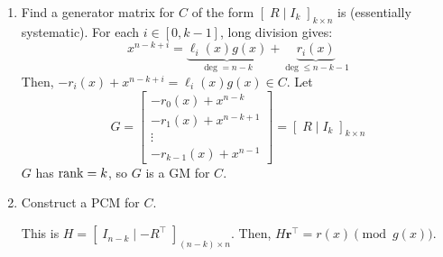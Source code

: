 \begin{enumerate}[label=(\roman*)]
    \item Find a generator matrix for $ C $ of the form
          $\left[ \; R\mid I_k\; \right]_{k\times n}$ is (essentially systematic).
          For each $ i\in [0,k-1] $, long division gives:
          \[ x^{n-k+i}=
              \underbrace{\ell_i(x)g(x)}_{\deg=n-k}+\underbrace{r_i(x)}_{\deg\leqslant n-k-1} \]
          Then, $ -r_i(x)+x^{n-k+i}=\ell_i(x)g(x)\in C $.
          Let
          \[ G=
              \begin{bmatrix}
                  -r_0(x)+x^{n-k}   \\
                  -r_1(x)+x^{n-k+1} \\
                  \vdots            \\
                  -r_{k-1}(x)+x^{n-1}
              \end{bmatrix}=\left[ \; R\mid I_k\; \right]_{k\times n}\]
          $ G $ has $ \operatorname{rank}=k $, so $ G $ is a GM for $ C $.

    \item Construct a PCM for $ C $.

          This is $ H=\left[ \; I_{n-k}\mid -R^{\top}\; \right]_{(n-k)\times n} $.
          Then, $ H\bm{r}^\top=r(x)\pmod{g(x)} $.
\end{enumerate}
